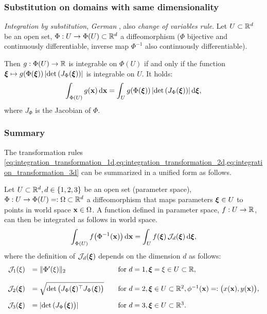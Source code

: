 \subsubsection{Substitution on domains with same dimensionality}
\emph{Integration by substitution}, \textit{German }, also \emph{change of variables rule}.
Let $U \subset \mathbb{R}^d$ be an open set, $\Phi:U \to \Phi(U) \subset\mathbb{R}^d$ a diffeomorphism ($\Phi$ bijective and continuously differentiable, inverse map $\Phi^{-1}$ also continuously differentiable).

Then $g:\Phi(U) \to \mathbb{R}$ is integrable on $\Phi(U)$ if and only if the function $\boldsymbol{\xi} \mapsto g(\Phi(\boldsymbol{\xi}))\,|\hbox{det} \,(J_{\Phi}(\boldsymbol{\xi}))|$ is integrable on $U$. It holds:
\begin{equation}\label{eq:integration_transformation_3d}
  \begin{array}{ll}
    \ds\int_{\Phi(U)} g(\bfx)\,\d \bfx = \ds\int_U g(\Phi(\bfxi))\,|\det(J_{\Phi}(\bfxi))|\,\d \bfxi,
  \end{array}
\end{equation}
where $J_{\Phi}$ is the Jacobian of $\Phi$.

\subsubsection{Summary}
The transformation rules \cref{eq:integration_transformation_1d,eq:integration_transformation_2d,eq:integration_transformation_3d} can be summarized in a unified form as follows.

Let $U \subset \mathbb{R}^d, d\in\{1,2,3\}$ be an open set (parameter space), $\Phi:U \to \Phi(U)=:\Omega \subset\mathbb{R}^d$ a diffeomorphism that maps parameters $\boldsymbol{\xi} \in U$ to points in world space $\textbf{x} \in \Omega$. A function defined in parameter space, $f:U\to \mathbb{R}$, can then be integrated as follows in world space.
%
\begin{equation}\label{eq:integration_transformation_dd}
  \begin{array}{lll}
    \ds\int_{\Phi(U)} f\big(\Phi^{-1}(\bfx)\big)\,\d \bfx = \ds\int_U f(\bfxi)\,\mathcal{J}_d(\bfxi)\,\d \bfxi,
  \end{array}
\end{equation}
where the definition of $\mathcal{J}_d(\boldsymbol{\xi})$  depends on the dimension $d$ as follows:
%
\begin{equation*}
  \begin{array}{rll}
    \mathcal{J}_1(\xi) &= \Vert \Phi'(\xi) \Vert_2 &\quad \text{for }d=1, \boldsymbol{\xi}=\xi \in U \subset \mathbb{R},\\[4mm]
    \mathcal{J}_2(\boldsymbol{\xi}) &= \sqrt{\hbox{det} \, \big(J_{\Phi}(\boldsymbol{\xi})^\top J_{\Phi}(\boldsymbol{\xi})\big)} &\quad \text{for }d=2, \boldsymbol{\xi}\in U \subset \mathbb{R}^2, \phi^{-1}(\textbf{x}) =: \big(x(\textbf{x}), y(\textbf{x})\big),\\[4mm]
    \mathcal{J}_3(\boldsymbol{\xi}) &= |\hbox{det} \, (J_{\Phi}\big(\boldsymbol{\xi})\big)| &\quad \text{for }d=3, \boldsymbol{\xi}\in U \subset \mathbb{R}^3.
  \end{array}
\end{equation*}

\newpage
\nocite{*}
{}


%


